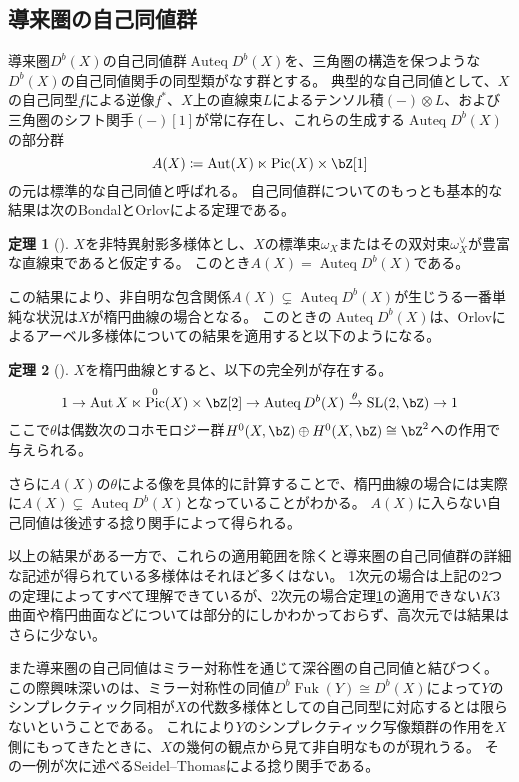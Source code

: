 \documentclass[uplatex,a4paper,dvipdfmx]{jsarticle}
\numberwithin{equation}{section}
\theoremstyle{definition}
\newtheorem{theorem}{定理}[section]
\DeclareMathOperator{\Auteq}{\mathrm{Auteq}}
\DeclareMathOperator{\Pic}{\mathrm{Pic}}
\DeclareMathOperator{\Aut}{\mathrm{Aut}}
\DeclareMathOperator{\SL}{\mathrm{SL}}
\DeclareMathOperator{\Fuk}{Fuk}
\begin{document}
\subsection{導来圏の自己同値群}
導来圏$D^b(X)$の自己同値群$\Auteq D^b(X)$を、三角圏の構造を保つような$D^b(X)$の自己同値関手の同型類がなす群とする。
典型的な自己同値として、$X$の自己同型$f$による逆像$f^*$、$X$上の直線束$L$によるテンソル積$(-)\otimes L$、および三角圏のシフト関手$(-)[1]$が常に存在し、これらの生成する$\Auteq D^b(X)$の部分群
\begin{equation}
	A(X) \coloneq \Aut(X) \ltimes \Pic(X) \times \bZ[1]
\end{equation}
の元は標準的な自己同値と呼ばれる。
自己同値群についてのもっとも基本的な結果は次のBondalとOrlovによる定理である。
\begin{theorem}[\cite{MR1818984}]\label{BO}
	$X$を非特異射影多様体とし、$X$の標準束$\omega_X$またはその双対束$\omega_X^\vee$が豊富な直線束であると仮定する。
	このとき$A(X) = \Auteq D^b(X)$である。
\end{theorem}
この結果により、非自明な包含関係$A(X) \subsetneq \Auteq D^b(X)$が生じうる一番単純な状況は$X$が楕円曲線の場合となる。
このときの$\Auteq D^b(X)$は、Orlovによるアーベル多様体についての結果\cite{MR1921811}を適用すると以下のようになる。
\begin{theorem}[\cite{MR1921811}]
	$X$を楕円曲線とすると、以下の完全列が存在する。
	\begin{equation}\label{eq:autoequivalence_of_elliptic_curve}
		1 \to \Aut{X} \ltimes \Pic^{0}(X)\times \bZ[2] \to \Auteq{D^b(X)} \xrightarrow{\theta} \SL(2, \bZ) \to 1
	\end{equation}
	ここで$\theta$は偶数次のコホモロジー群$H^0(X, \bZ) \oplus H^0(X, \bZ) \cong \bZ^2$への作用で与えられる。
\end{theorem}

さらに$A(X)$の$\theta$による像を具体的に計算することで、楕円曲線の場合には実際に$A(X) \subsetneq \Auteq D^b(X)$となっていることがわかる。
$A(X)$に入らない自己同値は後述する捻り関手によって得られる。

以上の結果がある一方で、これらの適用範囲を除くと導来圏の自己同値群の詳細な記述が得られている多様体はそれほど多くはない。
1次元の場合は上記の2つの定理によってすべて理解できているが、2次元の場合定理\ref{BO}の適用できない$K3$曲面や楕円曲面などについては部分的にしかわかっておらず、高次元では結果はさらに少ない。

また導来圏の自己同値はミラー対称性を通じて深谷圏の自己同値と結びつく。
この際興味深いのは、ミラー対称性の同値$D^b \Fuk(Y) \cong D^b (X)$によって$Y$のシンプレクティック同相が$X$の代数多様体としての自己同型に対応するとは限らないということである。
これにより$Y$のシンプレクティック写像類群の作用を$X$側にもってきたときに、$X$の幾何の観点から見て非自明なものが現れうる。
その一例が次に述べるSeidel--Thomasによる捻り関手である。
\end{document}
